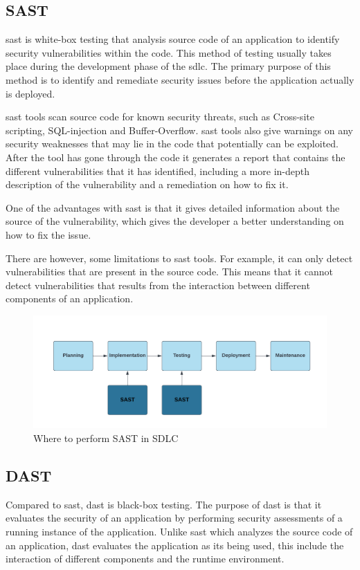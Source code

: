 \subsection{SAST}
\acrlong{sast} is white-box testing that analysis source code of an application to identify security vulnerabilities within the code. This method of testing usually takes place during the development phase of the \acrlong{sdlc}. The primary purpose of this method is to identify and remediate security issues before the application actually is deployed. \cite{sast}

\acrshort{sast} tools scan source code for known security threats, such as \gls{Cross-site scripting}, \gls{SQL-injection} and \gls{Buffer-Overflow}. \acrshort{sast} tools also give warnings on any security weaknesses that may lie in the code that potentially can be exploited. After the tool has gone through the code it generates a report that contains the different vulnerabilities that it has identified, including a more in-depth description of the vulnerability and a remediation on how to fix it. 

One of the advantages with \acrshort{sast} is that it gives detailed information about the source of the vulnerability, which gives the developer a better understanding on how to fix the issue. 

There are however, some limitations to \acrshort{sast} tools. For example, it can only detect vulnerabilities that are present in the source code. This means that it cannot detect vulnerabilities that results from the interaction between different components of an application.
\\
\begin{figure}[H]
    \centering
    \includegraphics[width=0.8\columnwidth]{Images/sast.png}
    \caption{Where to perform SAST in SDLC}
    \label{fig: Performance of SAST in SDLC}
\end{figure}

\newpage
\subsection{DAST}
Compared to \acrshort{sast}, \acrlong{dast} is black-box testing. The purpose of \acrshort{dast} is that it evaluates the security of an application by performing security assessments of a running instance of the application. Unlike \acrshort{sast} which analyzes the source code of an application, \acrshort{dast} evaluates the application as its being used, this include the interaction of different components and the runtime environment. 

